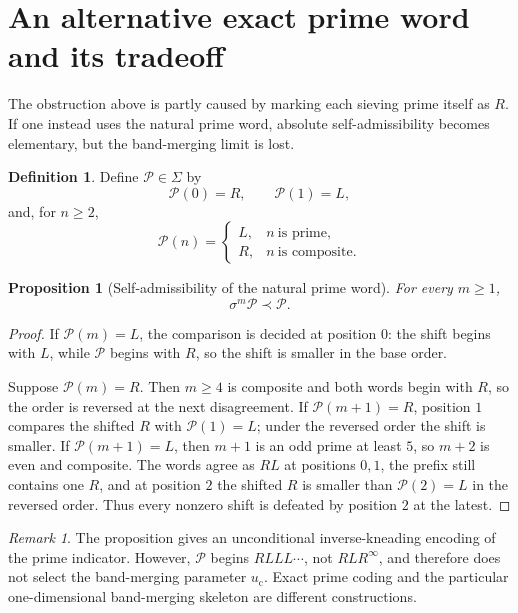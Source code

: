 \documentclass[11pt]{article}
\newtheorem{proposition}[theorem]{Proposition}
\theoremstyle{definition}
\newtheorem{definition}[theorem]{Definition}
\theoremstyle{remark}
\newtheorem{remark}[theorem]{Remark}
\newcommand{\cP}{\mathcal{P}}
\newcommand{\Sig}{\Sigma}
\newcommand{\sh}{\sigma}
\newcommand{\uc}{u_{\mathrm c}}
\begin{document}
\section{An alternative exact prime word and its tradeoff}

The obstruction above is partly caused by marking each sieving prime itself as $R$.  If one instead uses the natural prime word, absolute self-admissibility becomes elementary, but the band-merging limit is lost.

\begin{definition}
Define $\cP\in\Sig$ by
\[
    \cP(0)=R,\qquad \cP(1)=L,
\]
and, for $n\ge2$,
\[
    \cP(n)=
    \begin{cases}
        L,&n\ \text{is prime},\\
        R,&n\ \text{is composite}.
    \end{cases}
\]
\end{definition}

\begin{proposition}[Self-admissibility of the natural prime word]\label{prop:natural-prime}
For every $m\ge1$,
\[
    \sh^m\cP\prec\cP.
\]
\end{proposition}

\begin{proof}
If $\cP(m)=L$, the comparison is decided at position $0$: the shift begins with $L$, while $\cP$ begins with $R$, so the shift is smaller in the base order.

Suppose $\cP(m)=R$.  Then $m\ge4$ is composite and both words begin with $R$, so the order is reversed at the next disagreement.  If $\cP(m+1)=R$, position $1$ compares the shifted $R$ with $\cP(1)=L$; under the reversed order the shift is smaller.  If $\cP(m+1)=L$, then $m+1$ is an odd prime at least $5$, so $m+2$ is even and composite.  The words agree as $RL$ at positions $0,1$, the prefix still contains one $R$, and at position $2$ the shifted $R$ is smaller than $\cP(2)=L$ in the reversed order.  Thus every nonzero shift is defeated by position $2$ at the latest.
\end{proof}

\begin{remark}
The proposition gives an unconditional inverse-kneading encoding of the prime indicator.  However, $\cP$ begins $RLLL\cdots$, not $RLR^\infty$, and therefore does not select the band-merging parameter $\uc$.  Exact prime coding and the particular one-dimensional band-merging skeleton are different constructions.
\end{remark}
\end{document}
